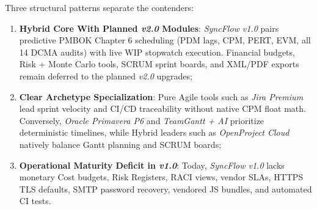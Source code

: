 Three structural patterns separate the contenders:
\begin{enumerate}[leftmargin=2.3em,labelsep=0.6em]
    \item \textbf{Hybrid Core With Planned \textit{v2.0} Modules}: \textit{SyncFlow v1.0} pairs predictive PMBOK Chapter 6 scheduling (PDM lags, CPM, PERT, EVM, all 14 DCMA audits) with live WIP stopwatch execution. Financial budgets, Risk + Monte Carlo tools, SCRUM sprint boards, and XML/PDF exports remain deferred to the planned \textit{v2.0} upgrades;

    \vspace{1mm}

    \item \textbf{Clear Archetype Specialization}: Pure Agile tools such as \textit{Jira Premium} lead sprint velocity and CI/CD traceability without native CPM float math. Conversely, \textit{Oracle Primavera P6} and \textit{TeamGantt + AI} prioritize deterministic timelines, while Hybrid leaders such as \textit{OpenProject Cloud} natively balance Gantt planning and SCRUM boards;

    \vspace{1mm}

    \item \textbf{Operational Maturity Deficit in \textit{v1.0}}: Today, \textit{SyncFlow v1.0} lacks monetary Cost budgets, Risk Registers, RACI views, vendor SLAs, HTTPS TLS defaults, SMTP password recovery, vendored JS bundles, and automated CI tests.
\end{enumerate}

